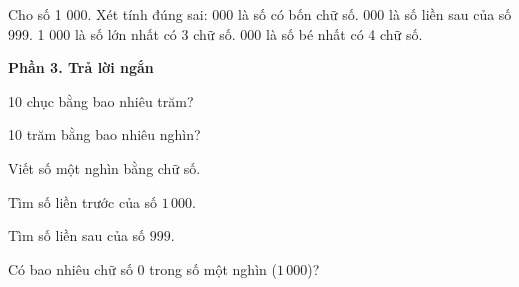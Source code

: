 \begin{ex} %
Cho số 1 000. Xét tính đúng sai:
\choiceTF
{ 000 là số có bốn chữ số.}
{ 000 là số liền sau của số 999.}
{1 000 là số lớn nhất có 3 chữ số.}
{ 000 là số bé nhất có 4 chữ số.}
\end{ex}

\textbf{Phần 3. Trả lời ngắn}

\begin{ex} %
10 chục bằng bao nhiêu trăm?
\end{ex}

\begin{ex} %
10 trăm bằng bao nhiêu nghìn?
\end{ex}

\begin{ex} %
Viết số một nghìn bằng chữ số.
\end{ex}

\begin{ex} %
Tìm số liền trước của số $1\,000$.
\end{ex}

\begin{ex} %
Tìm số liền sau của số $999$.
\end{ex}

\begin{ex} %
Có bao nhiêu chữ số 0 trong số một nghìn ($1\,000$)?
\end{ex}
